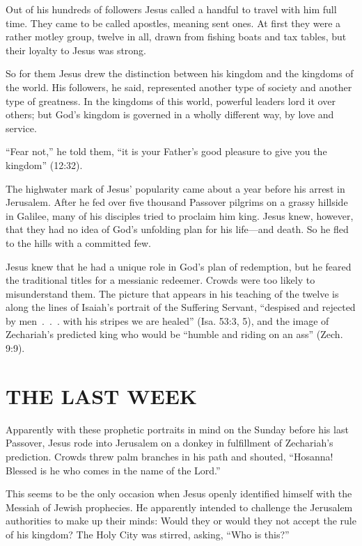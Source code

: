 Out of his hundreds of followers Jesus called a handful to travel with him full time. They came to
be called apostles, meaning sent ones. At first they were a rather motley group, twelve in all,
drawn from fishing boats and tax tables, but their loyalty to Jesus was strong.

So for them Jesus drew the distinction between his kingdom and the kingdoms of the world. His
followers, he said, represented another type of society and another type of greatness. In the
kingdoms of this world, powerful leaders lord it over others; but God’s kingdom is governed in a
wholly different way, by love and service.

“Fear not,” he told them, “it is your Father’s good pleasure to give you the kingdom” (12:32).

The highwater mark of Jesus’ popularity came about a year before his arrest in Jerusalem. After he
fed over five thousand Passover pilgrims on a grassy hillside in Galilee, many of his disciples
tried to proclaim him king. Jesus knew, however, that they had no idea of God’s unfolding plan for
his life—and death. So he fled to the hills with a committed few.

Jesus knew that he had a unique role in God’s plan of redemption, but he feared the traditional
titles for a messianic redeemer. Crowds were too likely to misunderstand them. The picture that
appears in his teaching of the twelve is along the lines of Isaiah’s portrait of the Suffering
Servant, “despised and rejected by men~.~.~. with his stripes we are healed” (Isa. 53:3, 5), and the
image of Zechariah’s predicted king who would be “humble and riding on an ass” (Zech. 9:9).

\section{THE LAST WEEK}

Apparently with these prophetic portraits in mind on the Sunday before his last Passover, Jesus rode
into Jerusalem on a donkey in fulfillment of Zechariah’s prediction. Crowds threw palm branches in
his path and shouted, “Hosanna! Blessed is he who comes in the name of the Lord.”

This seems to be the only occasion when Jesus openly identified himself with the Messiah of Jewish
prophecies. He apparently intended to challenge the Jerusalem authorities to make up their minds:
Would they or would they not accept the rule of his kingdom? The Holy City was stirred, asking, “Who
is this?”

